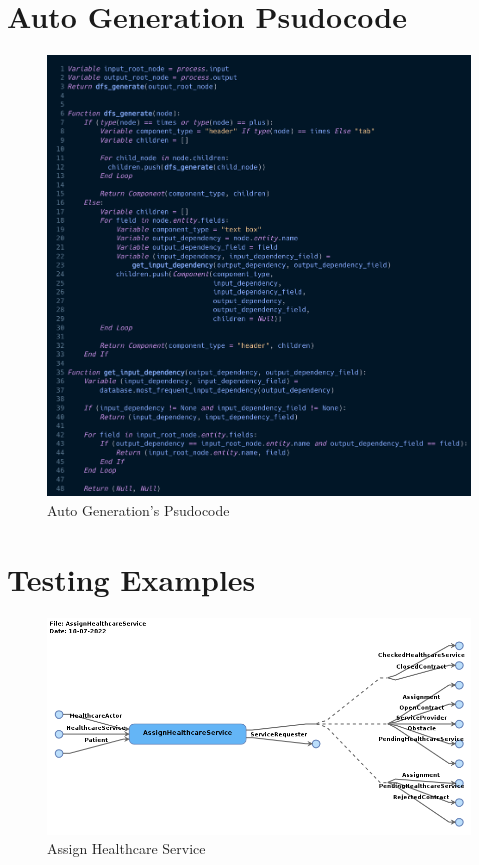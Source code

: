 \chapter{Auto Generation Psudocode}
\label{appendix:auto_gen_psudo}
\begin{figure}[ht!]
    \centering
    \includegraphics[width=\textwidth]{overleaf/images/auto_gen_psudo.png}
    \caption{Auto Generation's Psudocode}
    \label{fig:auto_gen_psudo}
\end{figure}




\chapter{Testing Examples}
\label{appendix:testing}

\begin{figure}
    \centering
    \includegraphics[width=\textwidth]{overleaf/images/testing/AssignHealthcareService.png}
    \caption{Assign Healthcare Service}
    \label{appendix:fig:AssignHealthcareService}
\end{figure}

